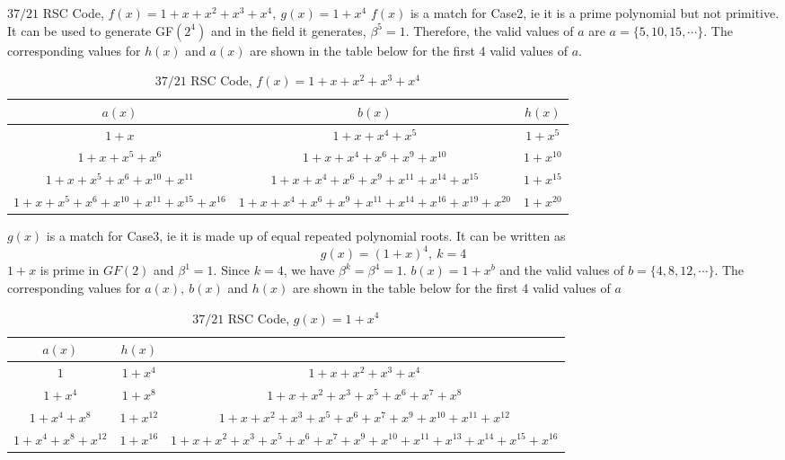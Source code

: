 \begin{example}
$37/21$ RSC Code, $f(x)=1+x+x^2+x^3+x^4,~g(x)=1+x^4$\newline
$f(x)$ is a match for Case2, ie it is a prime polynomial but not primitive. It can be used to generate GF$(2^4)$ and in the field it generates, $\beta^{5}=1$. Therefore, the valid values of $a$ are $a=\{5,10,15,\cdots\}$. The corresponding values for $h(x)$ and $a(x)$ are shown in the table below for the first 4 valid values of $a$.

 \begin{table*}[h]
 \caption{$37/21$ RSC Code, $f(x)=1+x+x^2+x^3+x^4$}
\centering
 \begin{tabular}{c c c} 
 \hline
 $a(x)$ & $b(x)$ & $h(x)$ \\ [0.5ex] 
 \hline\hline
$1+x$ &$1+x+x^4+x^5$ &  $1+x^5$\\ 
$1+x+x^5+x^6$ &$1+x+x^4+x^6+x^9+x^{10}$ & $1+x^{10}$ \\
$1+x+x^5+x^6+x^{10}+x^{11}$ & $1+x+x^4+x^6+x^9+x^{11}+x^{14}+x^{15}$ & $1+x^{15}$ \\
$1+x+x^5+x^6+x^{10}+x^{11}+x^{15}+x^{16}$ &$1+x+x^4+x^6+x^9+x^{11}+x^{14}+x^{16}+x^{19}+x^{20}$ & $1+x^{20}$ 
 \end{tabular}
 \label{novelTab3}
\end{table*}

$g(x)$ is a match for Case3, ie it is made up of equal repeated polynomial roots. It can be written as $$g(x)=(1+x)^4,~k=4$$ $1+x$ is prime in $GF(2)$ and $\beta^{1}=1$. Since $k=4$, we have $\beta^{k}=\beta^{4}=1$. $b(x)=1+x^b$ and the valid values of $b=\{4,8,12,\cdots \}$.
The corresponding values for $a(x),~b(x)$ and $h(x)$ are shown in the table below for the first 4 valid values of $a$

 \begin{table*}[h]
 \caption{$37/21$ RSC Code, $g(x)=1+x^4$}
\centering
 \begin{tabular}{c c c} 
 \hline
 $a(x)$ & $h(x)$ \\ [0.5ex] 
 \hline\hline
$1$ &  $1+x^4$ & $1+x+x^2+x^3+x^4$\\ 
$1+x^4$ & $1+x^{8}$ & $1+x+x^2+x^3+x^5+x^6+x^7+x^8$ \\
$1+x^4+x^8$ & $1+x^{12}$ & $1+x+x^2+x^3+x^5+x^6+x^7+x^9+x^{10}+x^{11}+x^{12}$\\
$1+x^4+x^8+x^{12}$ & $1+x^{16}$ & $1+x+x^2+x^3+x^5+x^6+x^7+x^9+x^{10}+x^{11}+x^{13}+x^{14}+x^{15}+x^{16}$
 \end{tabular}
 \label{novelTab4}
\end{table*}

\end{example}
